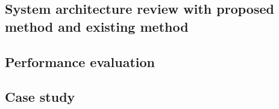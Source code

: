 \subsection{System architecture review with proposed method and existing method}
\label{result:overview:system_architecture_review_with_proposed_method_and_existing_method}

\subsection{Performance evaluation}
\label{result:overview:performance_evaluation}

\subsection{Case study}
\label{result:overview:case_study}
